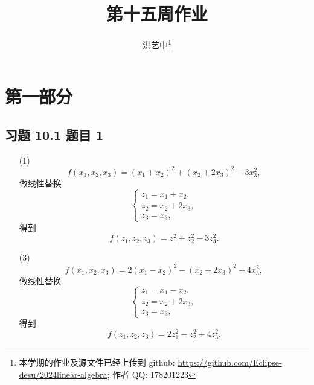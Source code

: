 \title{第十五周作业}
\author{洪艺中\thanks{本学期的作业及源文件已经上传到 {github}: \url{https://github.com/Eclipse-desu/2024linear-algebra}; 作者 QQ: 178201223}}
\maketitle
\section{第一部分}
\newcommand{\lvec}[1]{\overrightarrow{#1}}

\subsection*{ 习题 10.1 题目 1 }
\begin{solution}
\begin{enumerate}
    \item[(1)] \[
        f(x_1, x_2, x_3) = (x_1 + x_2)^2 + (x_2 + 2x_3)^2 - 3x_3^2,
    \]
    做线性替换
    \[
    \begin{cases}
        z_1 = x_1 + x_2, \\
        z_2 = x_2 + 2x_3, \\
        z_3 = x_3,
    \end{cases}
    \]
    得到
    \[
        f(z_1, z_2, z_3) = z_1^2 + z_2^2 - 3z_3^2.
    \]
    \item[(3)] \[
        f(x_1, x_2, x_3) = 2(x_1 - x_2)^2 - (x_2 + 2x_3)^2 + 4x_3^2,
    \]
    做线性替换
    \[
    \begin{cases}
        z_1 = x_1 - x_2, \\
        z_2 = x_2 + 2x_3, \\
        z_3 = x_3,
    \end{cases}
    \]
    得到
    \[
        f(z_1, z_2, z_3) = 2z_1^2 - z_2^2 + 4z_3^2.
    \]
\end{enumerate}
\end{solution}

\newpage
